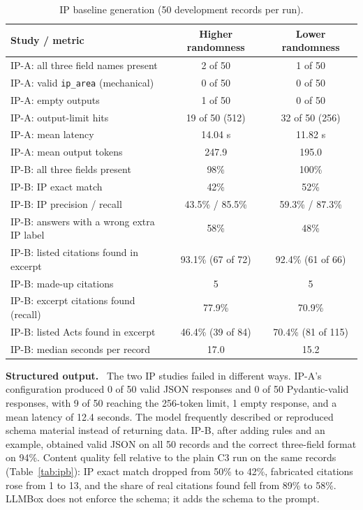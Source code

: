 \documentclass[10pt,letterpaper]{article}
\newcommand{\para}[1]{\textbf{#1}\ }
\newcommand{\code}[1]{\texttt{\small #1}}
\begin{document}
\begin{table}[ht]
\centering\footnotesize
\caption{IP baseline generation (50 development records per run).}\label{tab:ipbase}
\begin{tabular}{@{}lcc@{}}
\toprule
\textbf{Study / metric} & \textbf{Higher randomness} & \textbf{Lower randomness}\\
\midrule
IP-A: all three field names present & 2 of 50 & 1 of 50\\
IP-A: valid \code{ip\_area} (mechanical) & 0 of 50 & 0 of 50\\
IP-A: empty outputs & 1 of 50 & 0 of 50\\
IP-A: output-limit hits & 19 of 50 (512) & 32 of 50 (256)\\
IP-A: mean latency & 14.04 s & 11.82 s\\
IP-A: mean output tokens & 247.9 & 195.0\\
\midrule
IP-B: all three fields present & 98\% & 100\%\\
IP-B: IP exact match & 42\% & 52\%\\
IP-B: IP precision / recall & 43.5\% / 85.5\% & 59.3\% / 87.3\%\\
IP-B: answers with a wrong extra IP label & 58\% & 48\%\\
IP-B: listed citations found in excerpt & 93.1\% (67 of 72) & 92.4\% (61 of 66)\\
IP-B: made-up citations & 5 & 5\\
IP-B: excerpt citations found (recall) & 77.9\% & 70.9\%\\
IP-B: listed Acts found in excerpt & 46.4\% (39 of 84) & 70.4\% (81 of 115)\\
IP-B: median seconds per record & 17.0 & 15.2\\
\bottomrule
\end{tabular}
\end{table}

\para{Structured output.} The two IP studies failed in different ways. IP-A's configuration produced 0 of 50 valid JSON responses and 0 of 50 Pydantic-valid responses, with 9 of 50 reaching the 256-token limit, 1 empty response, and a mean latency of 12.4 seconds. The model frequently described or reproduced schema material instead of returning data. IP-B, after adding rules and an example, obtained valid JSON on all 50 records and the correct three-field format on 94\%. Content quality fell relative to the plain C3 run on the same records (Table~\ref{tab:ipb}): IP exact match dropped from 50\% to 42\%, fabricated citations rose from 1 to 13, and the share of real citations found fell from 89\% to 58\%. LLMBox does not enforce the schema; it adds the schema to the prompt.
\end{document}
